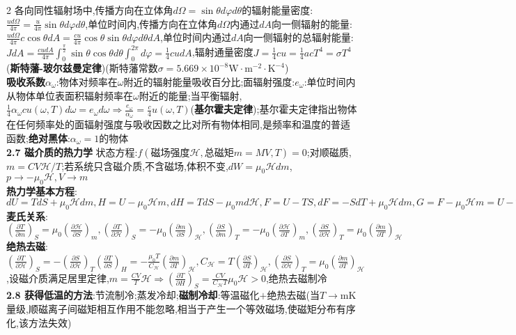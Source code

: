 \documentclass[10pt,a4paper]{article}
\begin{document}
\begin{multicols}{2}
各向同性辐射场中,传播方向在立体角$d\Omega=\sin\theta d\varphi d\theta$的辐射能量密度:$\frac{ud\Omega}{4\pi}=\frac{u}{4\pi}\sin\theta d\varphi d\theta$,单位时间内,传播方向在立体角$d\Omega$内通过$dA$向一侧辐射的能量:$\frac{ud\Omega}{4\pi}c\cos\theta dA=\frac{cu}{4\pi}\cos\theta\sin\theta d\varphi d\theta dA$,单位时间内通过$dA$向一侧辐射的总辐射能量:$JdA=\frac{cudA}{4\pi}\int_0^{\frac{\pi}{2}}\sin\theta\cos\theta d\theta\int_0^{2\pi}d\varphi=\frac{1}{4}cudA$,辐射通量密度$J=\frac{1}{4}cu=\frac{1}{4}acT^4=\sigma T^4$(\textbf{斯特藩-玻尔兹曼定律})(斯特藩常数$\sigma=5.669\times10^{-8}\text{W}\cdot\text{m}^{-2}\cdot\text{K}^{-4}$)\\
\textbf{吸收系数}$\alpha_{\omega}$:物体对频率在$\omega$附近的辐射能量吸收百分比;面辐射强度:$e_{\omega}$:单位时间内从物体单位表面积辐射频率在$\omega$附近的能量;当平衡辐射,$\frac{1}{4}\alpha_{\omega}cu(\omega,T)d\omega=e_{\omega}d\omega\Rightarrow\frac{e_{\omega}}{\alpha_{\omega}}=\frac{c}{4}u(\omega,T)$(\textbf{基尔霍夫定律});基尔霍夫定律指出物体在任何频率处的面辐射强度与吸收因数之比对所有物体相同,是频率和温度的普适函数;\textbf{绝对黑体}:$\alpha_{\omega}=1$的物体\\
\textbf{2.7 磁介质的热力学}\quad
状态方程:$f(\text{磁场强度}\mathcal{H},\text{总磁矩}m=MV,T)=0$;对顺磁质,$m={CV\mathcal{H}}/{T}$;若系统只含磁介质,不含磁场,体积不变,$dW=\mu_0\mathcal{H}dm$,$p\rightarrow-\mu_0\mathcal{H},V\rightarrow m$\\
\textbf{热力学基本方程}:$dU=TdS+\mu_0\mathcal{H}dm,H=U-\mu_0\mathcal{H}m,dH=TdS-\mu_0md\mathcal{H},F=U-TS,dF=-SdT+\mu_0\mathcal{H}dm,G=F-\mu_0\mathcal{H}m=U-TS-\mu_0\mathcal{H}m,dG=-SdT-\mu_0md\mathcal{H}$\\
\textbf{麦氏关系}:$\left(\frac{\partial T}{\partial m}\right)_S=\mu_0\left(\frac{\partial\mathcal{H}}{\partial S}\right)_m,\left(\frac{\partial T}{\partial\mathcal{H}}\right)_S=-\mu_0\left(\frac{\partial m}{\partial S}\right)_{\mathcal{H}},\left(\frac{\partial S}{\partial m}\right)_T=-\mu_0\left(\frac{\partial\mathcal{H}}{\partial T}\right)_m,\left(\frac{\partial S}{\partial\mathcal{H}}\right)_T=\mu_0\left(\frac{\partial m}{\partial T}\right)_{\mathcal{H}}$\\
\textbf{绝热去磁}:$\left(\frac{\partial T}{\partial\mathcal{H}}\right)_S=-\left(\frac{\partial S}{\partial\mathcal{H}}\right)_T\left(\frac{\partial T}{\partial S}\right)_H=-\frac{\mu_0T}{C_{\mathcal{H}}}\left(\frac{\partial m}{\partial T}\right)_{\mathcal{H}},C_{\mathcal{H}}=T\left(\frac{\partial S}{\partial T}\right)_{\mathcal{H}},\left(\frac{\partial S}{\partial\mathcal{H}}\right)_T=\mu_0\left(\frac{\partial m}{\partial T}\right)_{\mathcal{H}}$,设磁介质满足居里定律,$m=\frac{CV}{T}\mathcal{H}\Rightarrow\left(\frac{\partial T}{\partial H}\right)_S=\frac{CV}{C_{\mathcal{H}}T}\mu_0\mathcal{H}>0$,绝热去磁制冷\\
\textbf{2.8 获得低温的方法}:节流制冷;蒸发冷却;\textbf{磁制冷却}:等温磁化$+$绝热去磁(当$T\rightarrow$mK量级,顺磁离子间磁矩相互作用不能忽略,相当于产生一个等效磁场,使磁矩分布有序化,该方法失效)
\end{multicols}
\end{document}
